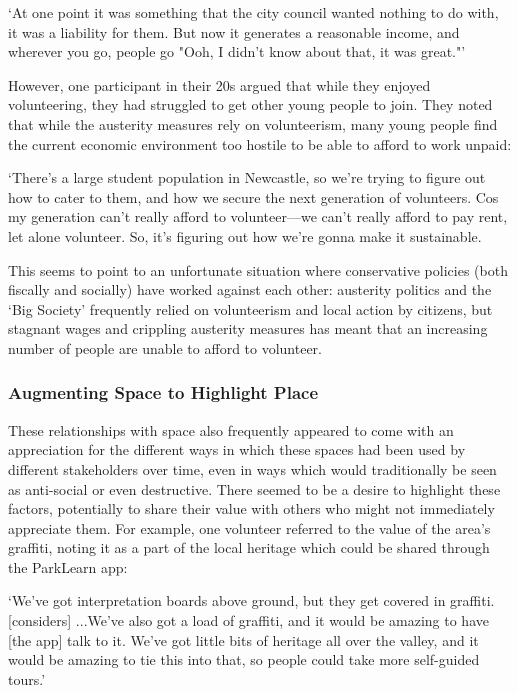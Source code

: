 \begin{displayquote}
`At one point it was something that the city council wanted nothing to do with, it was a liability for them. But now it generates a reasonable income, and wherever you go, people go "Ooh, I didn't know about that, it was great."' 
\end{displayquote}

However, one participant in their 20s argued that while they enjoyed volunteering, they had struggled to get other young people to join. They noted that while the austerity measures rely on volunteerism, many young people find the current economic environment too hostile to be able to afford to work unpaid: 

\begin{displayquote}
`There's a large student population in Newcastle, so we're trying to figure out how to cater to them, and how we secure the next generation of volunteers. Cos my generation can't really afford to volunteer---we can't really afford to pay rent, let alone volunteer. So, it's figuring out how we're gonna make it sustainable.
\end{displayquote}

This seems to point to an unfortunate situation where conservative policies (both fiscally and socially) have worked against each other: austerity politics and the `Big Society' frequently relied on volunteerism and local action by citizens, but stagnant wages and crippling austerity measures has meant that an increasing number of people are unable to afford to volunteer.

\subsubsection{Augmenting Space to Highlight Place}

These relationships with space also frequently appeared to come with an appreciation for the different ways in which these spaces had been used by different stakeholders over time, even in ways which would traditionally be seen as anti-social or even destructive. There seemed to be a desire to highlight these factors, potentially to share their value with others who might not immediately appreciate them. For example, one volunteer referred to the value of the area's graffiti, noting it as a part of the local heritage which could be shared through the ParkLearn app:

\begin{displayquote}
`We've got interpretation boards above ground, but they get covered in graffiti. [considers] ...We've also got a load of graffiti, and it would be amazing to have [the app] talk to it. We've got little bits of heritage all over the valley, and it would be amazing to tie this into that, so people could take more self-guided tours.'
\end{displayquote}

